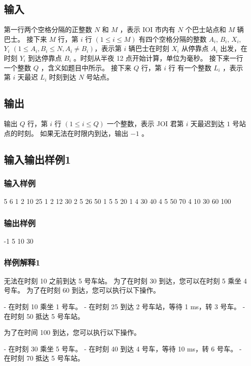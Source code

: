 \documentclass[UTF8]{ctexart}
\begin{document}
\subsection{输入}

第一行两个空格分隔的正整数 $N$ 和 $M$ ，表示 IOI 市内有 $N$ 个巴士站点和 $M$ 辆巴士。
接下来 $M$ 行，第 $i$ 行 $(1\le i\le M)$ 有四个空格分隔的整数 $A_i$, $B_i$, $X_i$, $Y_i$ $(1\le A_i,B_i\le N, A_i\neq B_i)$，表示第 $i$ 辆巴士在时刻 $X_i$ 从停靠点 $A_i$ 出发，在时刻 $Y_i$ 到达停靠点 $B_i$ 。时刻从半夜 12 点开始计算，单位为毫秒。
接下来一行一个整数 $Q$ ，含义如题目中所示。
接下来 $Q$ 行，第 $i$ 行  有一个整数 $L_i$ ，表示第 $i$ 天最迟 $L_i$ 时刻到达 $N$ 号站点。

\subsection{输出}

输出 $Q$ 行，第 $i$ 行 $(1\le i\le Q)$ 一个整数，表示 JOI 君第 $i$ 天最迟到达 $1$ 号站点的时刻。 如果无法在时限内到达，输出 $-1$ 。

\subsection{输入输出样例1}


\subsubsection{输入样例}

5 6
1 2 10 25
1 2 12 30
2 5 26 50
1 5 5 20
1 4 30 40
4 5 50 70
4
10
30
60
100

\subsubsection{输出样例}

-1
5
10
30

\subsubsection{样例解释1}

无法在时刻 10 之前到达 5 号车站。 为了在时刻 30 到达，您可以在时刻 5 乘坐 4 号车。 为了在时刻 60 到达，您可以执行以下操作。

- 在时刻 10 乘坐 1 号车。
- 在时刻 25 到达 2 号车站，等待 1 ms，转 3 号车。
- 在时刻 50 抵达 5 号车站。

为了在时间 100 到达，您可以执行以下操作。

- 在时刻 30 乘坐 5 号车。
- 在时刻 40 到达 4 号车，等待 10 ms，转 6 号车。
- 在时刻 70 抵达 5 号车站。
\end{document}
